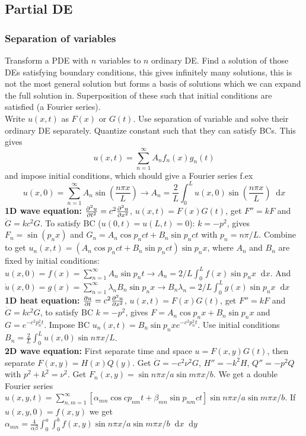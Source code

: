\documentclass[a4paper, 10pt]{article}
\newcommand*\diff{\mathop{}\!\mathrm{d}}
\begin{document}
\begin{multicols*}{3}
\begin{mdframed}
\subsection*{Partial DE}
\end{mdframed}
\subsubsection*{Separation of variables}
Transform a PDE with $n$ variables to $n$ ordinary DE. Find a solution of those DEs satisfying boundary conditions, this gives infinitely many solutions, this is not the most general solution but forms a basis of solutions which we can expand the full solution in. Superposition of these such that initial conditions are satisfied (a Fourier series).\\
Write $u(x,t)$ as $F(x)$ or $G(t)$. Use separation of variable and solve their ordinary DE separately. Quantize constant such that they can satisfy BCs. This gives
$$ u(x,t) = \sum_{n=1}^{\infty} A_n f_n(x)g_n(t)$$
and impose initial conditions, which should give a Fourier series f.ex
$$ u(x,0) = \sum_{n=1}^\infty A_n \sin{\left( \frac{n\pi x}{L} \right)} \rightarrow A_n = \frac{2}{L}\int_0^L u(x,0) \sin{\left( \frac{n\pi x}{L} \right)} \diff x$$
\textbf{1D wave equation:} $\pdv[2]{u}{t} = c^2\pdv[2]{u}{x}$, $u(x,t) = F(x)G(t)$, get $F'' = kF$ and $\ddot{G} = kc^2G$. To satisfy BC ($u(0,t) = u(L,t)=0$): $k=-p^2$, gives $F_n = \sin{\left(p_nx\right)}$ and $G_n = A_n \cos{p_nc t} + B_n\sin{p_nc t}$ with $p_n=n\pi/L$.
Combine to get $u_n(x,t) = \left(A_n \cos{p_nc t} + B_n\sin{p_nc t}\right)\sin{p_nx}$, where $A_n$ and $B_n$ are fixed by initial conditions: $u(x,0) = f(x) = \sum_{n=1}^{\infty}A_n \sin{p_n t} \rightarrow A_n = 2/L \int_0^Lf(x)\sin{p_nx}\diff x$. And $\dot{u}(x,0)=g(x)=\sum_{n=1}^{\infty}\lambda_nB_n\sin{p_nx} \rightarrow B_n\lambda_n = 2/L \int_0^L g(x)\sin{p_nx}\diff x$ \\
\textbf{1D heat equation:} $\pdv{u}{t} = c^2\pdv[2]{u}{x}$, $u(x,t) = F(x)G(t)$, get $F'' = kF$ and $\dot{G} = kc^2G$, to satisfy BC $k=-p^2$, gives $F=A_n\cos{p_nx}+B_n\sin{p_nx}$ and $G = e^{-c^2p_n^2t}$. Impose BC $u_n(x,t) = B_n\sin{p_nx}e^{-c^2p_n^2t}$. Use initial conditions $B_n=\frac{2}{L}\int_0^Lu(x,0)\sin{n\pi x/L}$.\\
\textbf{2D wave equation:} First separate time and space $u = F(x,y)G(t)$, then separate $F(x,y) = H(x)Q(y)$. Get $\ddot{G}=-c^2\nu^2G$, $H'' = -k^2H$, $Q'' = -p^2Q$ with $p^2+k^2 = \nu^2$. Get $F_{n}(x,y) = \sin{n\pi x/a}\sin{m\pi x/b}$. We get a double Fourier series
$u(x,y,t) = \sum_{n,m=1}^{\infty}[\alpha_{mn}\cos{cp_{nm}t} + \beta_{mn}\sin{p_{nm}ct}]\sin{n\pi x/a}\sin{m\pi x/b}$. If $u(x,y,0) = f(x,y)$ we get
$\alpha_{mn} = \frac{4}{\alpha\beta}\int_0^a\int_0^b f(x,y)\sin{n\pi x/a}\sin{m\pi x/b} \diff x \diff y$


\end{multicols*}
\end{document}
